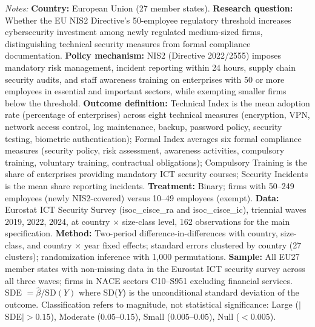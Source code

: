 \begin{table}[H]
\begin{threeparttable}
\begin{tablenotes}[flushleft]
\item \textit{Notes:} \textbf{Country:} European Union (27 member states). \textbf{Research question:} Whether the EU NIS2 Directive's 50-employee regulatory threshold increases cybersecurity investment among newly regulated medium-sized firms, distinguishing technical security measures from formal compliance documentation. \textbf{Policy mechanism:} NIS2 (Directive 2022/2555) imposes mandatory risk management, incident reporting within 24 hours, supply chain security audits, and staff awareness training on enterprises with 50 or more employees in essential and important sectors, while exempting smaller firms below the threshold. \textbf{Outcome definition:} Technical Index is the mean adoption rate (percentage of enterprises) across eight technical measures (encryption, VPN, network access control, log maintenance, backup, password policy, security testing, biometric authentication); Formal Index averages six formal compliance measures (security policy, risk assessment, awareness activities, compulsory training, voluntary training, contractual obligations); Compulsory Training is the share of enterprises providing mandatory ICT security courses; Security Incidents is the mean share reporting incidents. \textbf{Treatment:} Binary; firms with 50--249 employees (newly NIS2-covered) versus 10--49 employees (exempt). \textbf{Data:} Eurostat ICT Security Survey (isoc\_cisce\_ra and isoc\_cisce\_ic), triennial waves 2019, 2022, 2024, at country $\times$ size-class level, 162 observations for the main specification. \textbf{Method:} Two-period difference-in-differences with country, size-class, and country $\times$ year fixed effects; standard errors clustered by country (27 clusters); randomization inference with 1,000 permutations. \textbf{Sample:} All EU27 member states with non-missing data in the Eurostat ICT security survey across all three waves; firms in NACE sectors C10--S951 excluding financial services. SDE $= \hat{\beta} / \text{SD}(Y)$ where SD($Y$) is the unconditional standard deviation of the outcome. Classification refers to magnitude, not statistical significance: Large ($|$SDE$| > 0.15$), Moderate ($0.05$--$0.15$), Small ($0.005$--$0.05$), Null ($< 0.005$).
\end{tablenotes}
\end{threeparttable}
\end{table}
